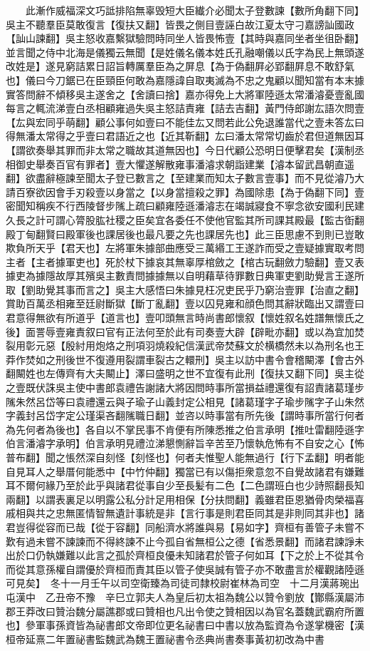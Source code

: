 　　此漸作威福深文巧詆排陷無辜毁短大臣纎介必聞太子登數諫【數所角翻下同】吳主不聽羣臣莫敢復言【復扶又翻】皆畏之側目壹誣白故江夏太守刁嘉謗訕國政【訕山諫翻】吳主怒收嘉繫獄驗問時同坐人皆畏怖壹【其時與嘉同坐者坐徂卧翻】並言聞之侍中北海是儀獨云無聞【是姓儀名儀本姓氏孔融嘲儀以氏字為民上無頭遂改姓是】遂見窮詰累日詔旨轉厲羣臣為之屏息【為于偽翻屛必郢翻屛息不敢舒氣也】儀曰今刀鋸已在臣頸臣何敢為嘉隱諱自取夷滅為不忠之鬼顧以聞知當有本末據實答問辭不傾移吳主遂舍之【舍讀曰捨】嘉亦得免上大將軍陸遜太常潘濬憂壹亂國每言之輒流涕壹白丞相顧雍過失吳主怒詰責雍【詰去吉翻】黃門侍郎謝厷語次問壹【厷與宏同乎萌翻】顧公事何如壹曰不能佳厷又問若此公免退誰當代之壹未答厷曰得無潘太常得之乎壹曰君語近之也【近其靳翻】厷曰潘太常常切齒於君但道無因耳【謂欲奏舉其罪而非太常之職故其道無因也】今日代顧公恐明日便擊君矣【漢制丞相御史舉奏百官有罪者】壹大懼遂解散雍事潘濬求朝詣建業【濬本留武昌朝直遥翻】欲盡辭極諫至聞太子登已數言之【至建業而知太子數言壹事】而不見從濬乃大請百寮欲因會手刃殺壹以身當之【以身當擅殺之罪】為國除患【為于偽翻下同】壹密聞知稱疾不行西陵督步隲上疏曰顧雍陸遜潘濬志在竭誠寢食不寧念欲安國利民建久長之計可謂心膂股肱社稷之臣矣宜各委任不使他官監其所司課其殿最【監古衘翻殿丁甸翻賢曰殿軍後也課居後也最凡要之先也課居先也】此三臣思慮不到則已豈敢欺負所天乎【君天也】左將軍朱據部曲應受三萬緡工王遂詐而受之壹疑據實取考問主者【主者據軍吏也】死於杖下據哀其無辜厚棺斂之【棺古玩翻斂力驗翻】壹又表據吏為據隱故厚其殯吳主數責問據據無以自明藉草待罪數日典軍吏劉助覺言王遂所取【劉助覺其事而言之】吳主大感悟曰朱據見枉况吏民乎乃窮治壹罪【治直之翻】賞助百萬丞相雍至廷尉斷獄【斷丁亂翻】壹以囚見雍和顔色問其辭狀臨出又謂壹曰君意得無欲有所道乎【道言也】壹叩頭無言時尚書郎懷叙【懷姓叙名姓譜無懷氏之後】面詈辱壹雍責叙曰官有正法何至於此有司奏壹大辟【辟毗亦翻】或以為宜加焚裂用彰元惡【殷紂用炮烙之刑項羽燒殺紀信漢武帝焚蘇文於横橋然未以為刑名也王莽作焚如之刑後世不復遵用裂謂車裂古之轘刑】吳主以訪中書令會稽闞澤【會古外翻闞姓也左傳齊有大夫闞止】澤曰盛明之世不宜復有此刑【復扶又翻下同】吳主從之壹既伏誅吳主使中書郎袁禮告謝諸大將因問時事所當損益禮還復有詔責諸葛瑾步隲朱然呂岱等曰袁禮還云與子瑜子山義封定公相見【諸葛瑾字子瑜步隲字子山朱然字義封呂岱字定公瑾渠吝翻隲職日翻】並咨以時事當有所先後【謂時事所當行何者為先何者為後也】各自以不掌民事不肯便有所陳悉推之伯言承明【推吐雷翻陸遜字伯言潘濬字承明】伯言承明見禮泣涕懇惻辭旨辛苦至乃懷執危怖有不自安之心【怖普布翻】聞之悵然深自刻怪【刻怪也】何者夫惟聖人能無過行【行下孟翻】明者能自見耳人之舉厝何能悉中【中竹仲翻】獨當已有以傷拒衆意忽不自覺故諸君有嫌難耳不爾何緣乃至於此乎與諸君從事自少至長髪有二色【二色謂班白也少詩照翻長知兩翻】以謂表裏足以明露公私分計足用相保【分扶問翻】義雖君臣恩猶骨肉榮福喜戚相與共之忠無匿情智無遺計事統是非【言行事是則君臣同其是非則同其非也】諸君豈得從容而已哉【從于容翻】同船濟水將誰與易【易如字】齊桓有善管子未嘗不歎有過未嘗不諫諫而不得終諫不止今孤自省無桓公之德【省悉景翻】而諸君諫諍未出於口仍執嫌難以此言之孤於齊桓良優未知諸君於管子何如耳【下之於上不從其令而從其意孫權自謂優於齊桓而責其臣以管子使吳誠有管子亦不敢盡言於權觀諸陸遜可見矣】　冬十一月壬午以司空衛臻為司徒司隸校尉崔林為司空　十二月漢蔣琬出屯漢中　乙丑帝不豫　辛巳立郭夫人為皇后初太祖為魏公以贊令劉放【酇縣漢屬沛郡王莽改曰贊治魏分屬譙郡或曰贊相也凡出令使之贊相因以為官名蓋魏武霸府所置也】參軍事孫資皆為祕書郎文帝即位更名祕書曰中書以放為監資為令遂掌機密【漢桓帝延熹二年置祕書監魏武為魏王置祕書令丞典尚書奏事黃初初改為中書